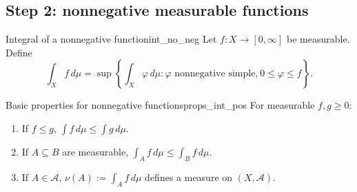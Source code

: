 \documentclass[11pt, a4paper]{article}
\begin{document}
\subsection{Step 2: nonnegative measurable functions}

\begin{definicion}{Integral of a nonnegative function}{int_no_neg}
Let $f: X \to [0, \infty]$ be measurable. Define
$$ \int_X f \, d\mu = \sup\left\{ \int_X \varphi \, d\mu : \varphi \text{ nonnegative simple,}
\ 0 \le \varphi \le f \right\}. $$
\end{definicion}

\begin{proposicion}{Basic properties for nonnegative functions}{props_int_pos}
For measurable $f, g \ge 0$:
\begin{enumerate}
    \item If $f \le g$, $\int f \, d\mu \le \int g \, d\mu$.
    \item If $A \subseteq B$ are measurable, $\int_A f \, d\mu \le \int_B f \, d\mu$.
    \item If $A \in \mathcal{A}$, $\nu(A) := \int_A f \, d\mu$ defines a measure on
    $(X, \mathcal{A})$.
\end{enumerate}
\end{proposicion}
\end{document}

